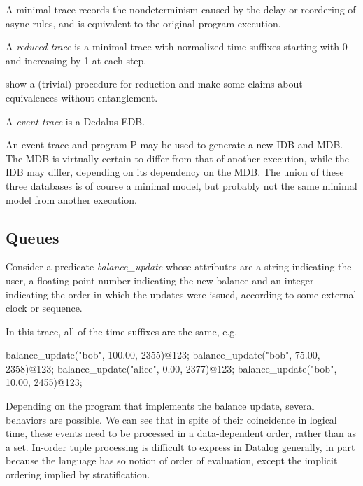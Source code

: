A minimal trace records the nondeterminism caused by the delay or reordering of async rules, and
is equivalent to the original program execution.  

\begin{definition}
A \emph{reduced trace} is a minimal trace with normalized time suffixes starting with 0 and increasing by 1 at each step.
\end{definition}

show a (trivial) procedure for reduction and make some claims about equivalences without entanglement.

\begin{definition}
A \emph{event trace} is a Dedalus EDB.
\end{definition}

An event trace and program P may be used to generate a new IDB and MDB.  The MDB is virtually certain to differ from that of another
execution, while the IDB may differ, depending on its dependency on the MDB.  The union of these three databases is of course a
minimal model, but probably not the same minimal model from another execution.  






\subsection{Queues}

Consider a predicate \emph{balance\_update} whose attributes are a string indicating the user, a floating point number
indicating the new balance and an integer indicating the order in which the updates were issued, according to some 
external clock or sequence.  

In this trace, all of the time suffixes are the same, e.g.

\begin{Dedalus}
balance\_update("bob", 100.00, 2355)@123;
balance\_update("bob", 75.00, 2358)@123;
balance\_update("alice", 0.00, 2377)@123;
balance\_update("bob", 10.00, 2455)@123;
\end{Dedalus}

Depending on the program that implements the balance update, several behaviors are possible.  We can see that in spite of their
coincidence in logical time, these events need to be processed in a data-dependent order, rather than as a set.  In-order tuple 
processing is difficult to express in Datalog generally, in part because the language has so notion of order of evaluation, except
the implicit ordering implied by stratification.

